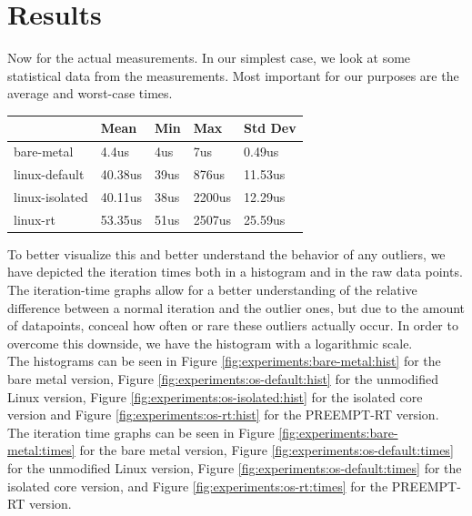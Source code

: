 \section{Results}
\label{sec:experiments:results}

Now for the actual measurements.
In our simplest case, we look at some statistical data from the measurements.
Most important for our purposes are the average and worst-case times.

\begin{table}[h!]
  \label{tab:measurments}
  \begin{tabular}{|l|l|l|l|l|}
    \hline
                   & Mean    & Min  & Max    & Std Dev \\ \hline
    bare-metal     & 4.4us   & 4us  & 7us    & 0.49us  \\ \hline
    linux-default  & 40.38us & 39us & 876us  & 11.53us \\ \hline
    linux-isolated & 40.11us & 38us & 2200us & 12.29us \\ \hline
    linux-rt       & 53.35us & 51us & 2507us & 25.59us \\ \hline
  \end{tabular}
\end{table}

To better visualize this and better understand the behavior of any outliers, we have depicted the iteration times both in a histogram and in the raw data points.
The iteration-time graphs allow for a better understanding of the relative difference between a normal iteration and the outlier ones,
but due to the amount of datapoints, conceal how often or rare these outliers actually occur.
In order to overcome this downside, we have the histogram with a logarithmic scale.\\
The histograms can be seen in Figure \ref{fig:experiments:bare-metal:hist} for the bare metal version, Figure \ref{fig:experiments:os-default:hist} for the unmodified Linux version, Figure \ref{fig:experiments:os-isolated:hist} for the isolated core version and Figure \ref{fig:experiments:os-rt:hist} for the PREEMPT-RT version.\\
The iteration time graphs can be seen in Figure \ref{fig:experiments:bare-metal:times} for the bare metal version, Figure \ref{fig:experiments:os-default:times} for the unmodified Linux version, Figure \ref{fig:experiments:os-default:times} for the isolated core version, and Figure \ref{fig:experiments:os-rt:times} for the PREEMPT-RT version.

\makeatletter
\newcommand{\includesvggraphics}[2][\textwidth]{
  \filename@parse{#2}%
  
}
\makeatother

